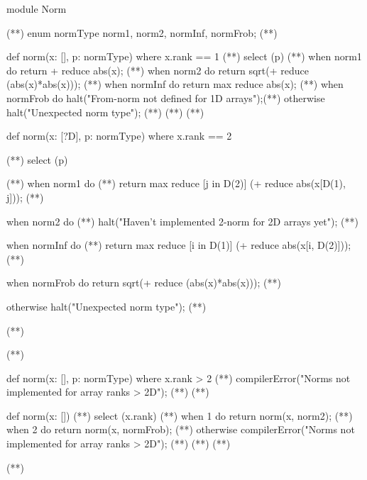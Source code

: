 \begin{numberedchapel}
module Norm{                                    (*\label{norm_start}*)
  enum normType {norm1, norm2, normInf, normFrob}; (*\label{norm_enum}*)

  def norm(x: [], p: normType) where x.rank == 1 { (*\label{vec_start}*)
    select (p) {                                   (*\label{vec_select_start}*)
      when norm1 do return + reduce abs(x);        (*\label{vec_norm1}*)
      when norm2 do return sqrt(+ reduce (abs(x)*abs(x)));  (*\label{vec_norm2}*)
      when normInf do return max reduce abs(x);  (*\label{vec_normInf}*)
      when normFrob do halt("From-norm not defined for 1D arrays");(*\label{vec_normFrob}*)
      otherwise halt("Unexpected norm type"); (*\label{vec_unexp}*)
    } (*\label{vec_select_end}*)
  } (*\label{vec_end}*)

  def norm(x: [?D], p: normType) where x.rank == 2 { (*\label{mat_start}*)
    select (p) {                                     (*\label{mat_select_start}*)
      when norm1 do                                  (*\label{mat_norm1_1}*)
        return max reduce [j in D(2)] (+ reduce abs(x[D(1), j])); (*\label{mat_norm1_2}*)

      when norm2 do  (*\label{mat_norm2_1}*)
        halt("Haven't implemented 2-norm for 2D arrays yet"); (*\label{mat_norm2_2}*)

      when normInf do  (*\label{mat_normInf_1}*)
        return max reduce [i in D(1)] (+ reduce abs(x[i, D(2)])); (*\label{mat_normInf_2}*)

      when normFrob do return sqrt(+ reduce (abs(x)*abs(x))); (*\label{mat_normFrob}*)

      otherwise halt("Unexpected norm type"); (*\label{mat_unexp}*)
    } (*\label{mat_select_end}*)
  } (*\label{mat_end}*)

  def norm(x: [], p: normType) where x.rank > 2 { (*\label{large_rank_start}*)
    compilerError("Norms not implemented for array ranks > 2D"); (*\label{comp_err_1}*)
  } (*\label{large_rank_end}*)

  def norm(x: []) { (*\label{norm_default_start}*)
    select (x.rank) { (*\label{default_select_start}*)
      when 1 do return norm(x, norm2);  (*\label{default_vec}*)
      when 2 do return norm(x, normFrob); (*\label{default_mat}*)
      otherwise compilerError("Norms not implemented for array ranks > 2D"); (*\label{comp_err_2}*)
    }   (*\label{default_select_end}*)
  }  (*\label{norm_default_end}*)
} (*\label{norm_end}*)


\end{numberedchapel}

